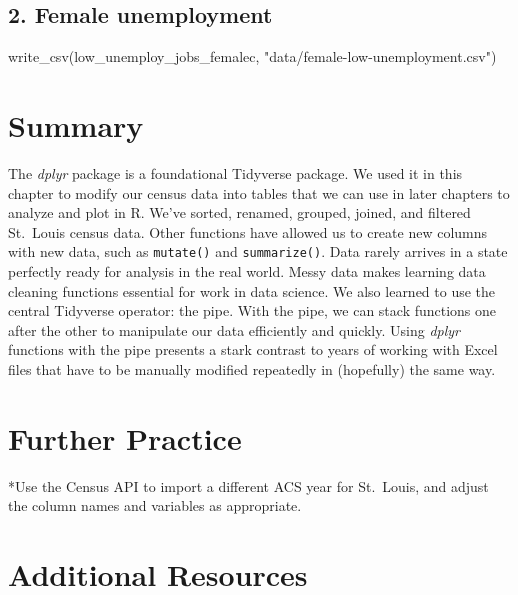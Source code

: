 \documentclass[
  krantz2]{krantz}
\makeatletter
\newenvironment{Shaded}{\begin{snugshade}}{\end{snugshade}}
\newcommand{\FunctionTok}[1]{\textcolor[rgb]{0,0,0}{#1}}
\newcommand{\NormalTok}[1]{#1}
\newcommand{\StringTok}[1]{\textcolor[rgb]{0.5,0.5,0.5}{#1}}
\newenvironment{kframe}{%
\medskip{}
\setlength{\fboxsep}{.8em}
 \def\at@end@of@kframe{}%
 \ifinner\ifhmode%
  \def\at@end@of@kframe{\end{minipage}}%
  \begin{minipage}{\columnwidth}%
 \fi\fi%
 \def\FrameCommand##1{\hskip\@totalleftmargin \hskip-\fboxsep
 \colorbox{shadecolor}{##1}\hskip-\fboxsep
     \hskip-\linewidth \hskip-\@totalleftmargin \hskip\columnwidth}%
 \MakeFramed {\advance\hsize-\width
   \@totalleftmargin\z@ \linewidth\hsize
   \@setminipage}}%
 {\par\unskip\endMakeFramed%
 \at@end@of@kframe}
\renewenvironment{Shaded}{\begin{kframe}}{\end{kframe}}
\makeatother
\begin{document}
\hypertarget{female-unemployment}{%
\subsection{2. Female unemployment}\label{female-unemployment}}

\begin{Shaded}
\begin{Highlighting}[]
\FunctionTok{write\_csv}\NormalTok{(low\_unemploy\_jobs\_femalec, }\StringTok{"data/female{-}low{-}unemployment.csv"}\NormalTok{)}
\end{Highlighting}
\end{Shaded}

\hypertarget{dplyr-summary}{%
\section{Summary}\label{dplyr-summary}}

The \emph{dplyr} package is a foundational Tidyverse package. We used it in this chapter to modify our census data into tables that we can use in later chapters to analyze and plot in R. We've sorted, renamed, grouped, joined, and filtered St.~Louis census data. Other functions have allowed us to create new columns with new data, such as \texttt{mutate()} and \texttt{summarize()}. Data rarely arrives in a state perfectly ready for analysis in the real world. Messy data makes learning data cleaning functions essential for work in data science. We also learned to use the central Tidyverse operator: the pipe. With the pipe, we can stack functions one after the other to manipulate our data efficiently and quickly. Using \emph{dplyr} functions with the pipe presents a stark contrast to years of working with Excel files that have to be manually modified repeatedly in (hopefully) the same way.

\hypertarget{dplyr-study}{%
\section{Further Practice}\label{dplyr-study}}

*Use the Census API to import a different ACS year for St.~Louis, and adjust the column names and variables as appropriate.

\hypertarget{dplyr-resources}{%
\section{Additional Resources}\label{dplyr-resources}}
\end{document}
